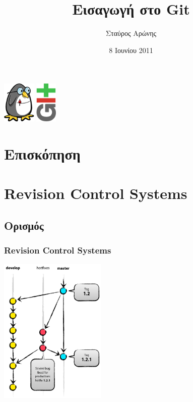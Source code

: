 \documentclass[]{beamer}
\title{Εισαγωγή στο Git}
\author{Σταύρος Αρώνης}
\date{8 Ιουνίου 2011}
\institute{Κοινότητα Ελεύθερου Λογισμικού ΕΜΠ}
\begin{document}
\begin{frame}
  \titlepage
  \begin{center}
    \includegraphics[height=2cm]{Fosstux.png}
    \hspace{1cm}
    \includegraphics[height=2cm]{git-logo.png}
  \end{center}
\end{frame}

\section*{Επισκόπηση}
\begin{frame}
  \tableofcontents[hidesubsections]
\end{frame}

\section{Revision Control Systems}

\subsection{Ορισμός}

\begin{frame}
  \frametitle{Revision Control Systems}
  \begin{center}
    \includegraphics[height=7cm]{hotfix-branches1.png}
  \end{center}
\end{frame}
\end{document}
